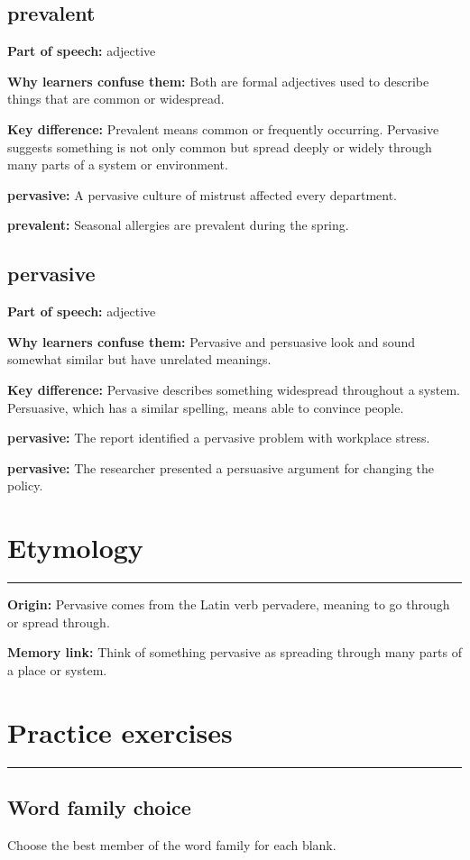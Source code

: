 \documentclass[11pt]{article}
\newcommand{\sectionrule}{\par\vspace{-0.5em}\noindent\textcolor{Accent}{\rule{\linewidth}{0.6pt}}\par}
\begin{document}
\subsection{prevalent}
\textbf{Part of speech:} adjective

\textbf{Why learners confuse them:} Both are formal adjectives used to describe things that are common or widespread.

\textbf{Key difference:} Prevalent means common or frequently occurring. Pervasive suggests something is not only common but spread deeply or widely through many parts of a system or environment.

\textbf{pervasive:} A pervasive culture of mistrust affected every department.

\textbf{prevalent:} Seasonal allergies are prevalent during the spring.

\subsection{pervasive}
\textbf{Part of speech:} adjective

\textbf{Why learners confuse them:} Pervasive and persuasive look and sound somewhat similar but have unrelated meanings.

\textbf{Key difference:} Pervasive describes something widespread throughout a system. Persuasive, which has a similar spelling, means able to convince people.

\textbf{pervasive:} The report identified a pervasive problem with workplace stress.

\textbf{pervasive:} The researcher presented a persuasive argument for changing the policy.

\section{Etymology}
\sectionrule
\textbf{Origin:} Pervasive comes from the Latin verb pervadere, meaning to go through or spread through.

\textbf{Memory link:} Think of something pervasive as spreading through many parts of a place or system.

\section{Practice exercises}
\sectionrule
\subsection{Word family choice}
Choose the best member of the word family for each blank.
\end{document}
